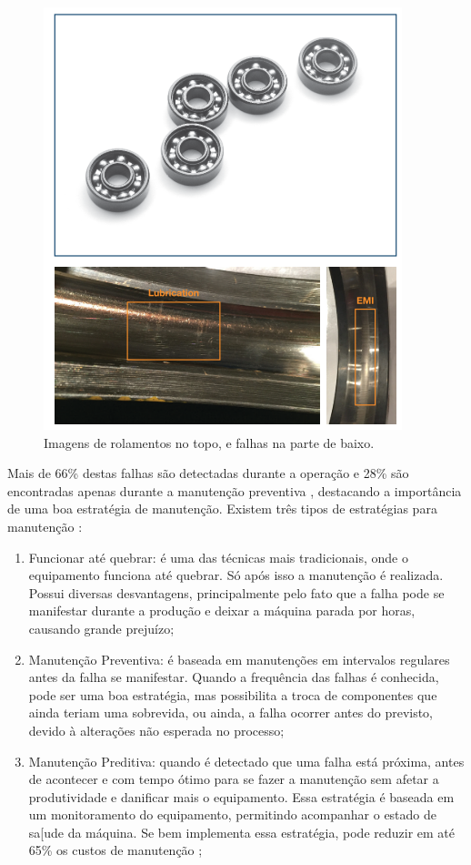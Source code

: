\begin{figure}[H]
    \caption{Imagens de rolamentos no topo, e falhas na parte de baixo.}
    \begin{center}
        \includegraphics[scale=.5]{referencial/img/bearing_analog_p3.png}
    \end{center}
    \label{fig:bearing_analog_p3}
\end{figure}

Mais de 66\% destas falhas são detectadas durante a operação e 28\% são encontradas apenas durante a manutenção 
preventiva \cite{Gorbounov2018}, destacando a importância de uma boa estratégia de manutenção. Existem três tipos de estratégias 
para manutenção \cite{Wu2013}:  

\begin{enumerate}
    \item Funcionar até quebrar: é uma das técnicas mais tradicionais, onde o equipamento funciona até quebrar. Só após isso a
manutenção é realizada. Possui diversas desvantagens, principalmente pelo fato que a falha pode se manifestar durante a produção e
deixar a máquina parada por horas, causando grande prejuízo;
    \item Manutenção Preventiva: é baseada em manutenções em intervalos regulares antes da falha se manifestar. Quando a frequência das
falhas é conhecida, pode ser uma boa estratégia, mas possibilita a troca de componentes que ainda teriam uma sobrevida, ou ainda, a falha
ocorrer antes do previsto, devido à alterações não esperada no processo;
    \item Manutenção Preditiva: quando é detectado que uma falha está próxima, antes de acontecer e com tempo ótimo para se fazer a 
manutenção sem afetar a produtividade e danificar mais o equipamento. Essa estratégia é baseada em um monitoramento do equipamento,
permitindo acompanhar o estado de sa[ude da máquina. Se bem implementa essa estratégia, pode reduzir em até 65\% os custos de manutenção
\cite{Wu2013};
\end{enumerate}

